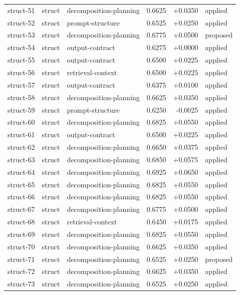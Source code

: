 \begin{center}
\begin{longtable}{llp{5.2cm}rrl}
struct-51 & struct & decomposition-planning & 0.6625 & +0.0350 & applied \\
struct-52 & struct & prompt-structure & 0.6525 & +0.0250 & applied \\
struct-53 & struct & decomposition-planning & 0.6775 & +0.0500 & proposed \\
struct-54 & struct & output-contract & 0.6275 & +0.0000 & applied \\
struct-55 & struct & output-contract & 0.6500 & +0.0225 & applied \\
struct-56 & struct & retrieval-context & 0.6500 & +0.0225 & applied \\
struct-57 & struct & output-contract & 0.6375 & +0.0100 & applied \\
struct-58 & struct & decomposition-planning & 0.6625 & +0.0350 & applied \\
struct-59 & struct & prompt-structure & 0.6250 & -0.0025 & applied \\
struct-60 & struct & decomposition-planning & 0.6825 & +0.0550 & applied \\
struct-61 & struct & output-contract & 0.6500 & +0.0225 & applied \\
struct-62 & struct & decomposition-planning & 0.6650 & +0.0375 & applied \\
struct-63 & struct & decomposition-planning & 0.6850 & +0.0575 & applied \\
struct-64 & struct & decomposition-planning & 0.6925 & +0.0650 & applied \\
struct-65 & struct & decomposition-planning & 0.6825 & +0.0550 & applied \\
struct-66 & struct & decomposition-planning & 0.6825 & +0.0550 & applied \\
struct-67 & struct & decomposition-planning & 0.6775 & +0.0500 & applied \\
struct-68 & struct & retrieval-context & 0.6450 & +0.0175 & applied \\
struct-69 & struct & decomposition-planning & 0.6825 & +0.0550 & applied \\
struct-70 & struct & decomposition-planning & 0.6625 & +0.0350 & applied \\
struct-71 & struct & decomposition-planning & 0.6525 & +0.0250 & proposed \\
struct-72 & struct & decomposition-planning & 0.6625 & +0.0350 & applied \\
struct-73 & struct & decomposition-planning & 0.6525 & +0.0250 & applied \\

\end{longtable}
\end{center}
